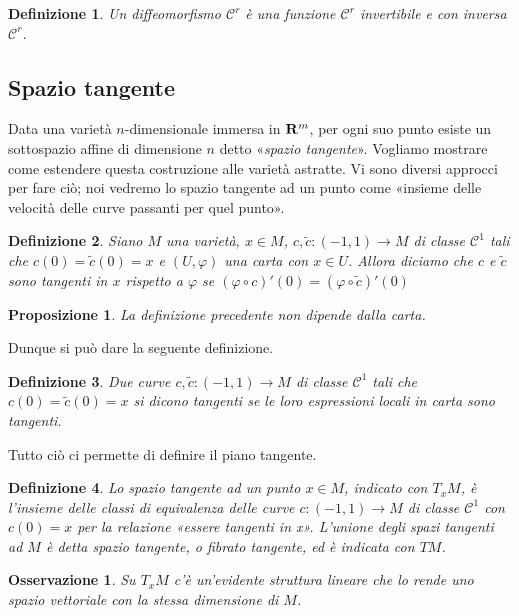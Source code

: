 \documentclass{article}
\newcommand{\PHI}{\varphi}
\newcommand{\composto}{\circ}
\newcommand{\cors}[1]{\textit{#1}}%
\newcommand{\ci}[1]{\mathscr{#1}}%
\newtheorem{definizione}{ Definizione}
\newtheorem{oss}{ Osservazione}
\newtheorem{proposizione}{ Proposizione}
\begin{document}
 \begin{definizione}
  Un diffeomorfismo $\ci{C}^r$ è una funzione $\ci{C}^r$ invertibile e con inversa $\ci{C}^r$.
 \end{definizione}
 
 \subsection{ Spazio tangente}
 
 Data una varietà $n$-dimensionale immersa in ${\bf R}^m$, per ogni suo punto esiste
 un sottospazio affine di dimensione $n$ detto «\cors{spazio tangente}». Vogliamo
 mostrare come estendere questa costruzione alle varietà astratte. Vi sono diversi
 approcci per fare ciò; noi vedremo lo spazio tangente ad un punto come «insieme delle
 velocità delle curve passanti per quel punto».
 
 \begin{definizione}
  Siano $M$ una varietà, $x\in M$, $c,\tilde{c}:(-1,1)\to M$ di classe $\ci{C}^1$ tali che
  $c(0)=\tilde{c}(0)=x$ e $(U,\PHI)$ una carta con $x\in U$. Allora diciamo che $c$ e
  $\tilde{c}$ sono tangenti in $x$ rispetto a $\PHI$ se $(\PHI\composto c)'(0)=(\PHI\composto\tilde{c})'(0)$
 \end{definizione}

 \begin{proposizione}
  La definizione precedente non dipende dalla carta.
 \end{proposizione}

 Dunque si può dare la seguente definizione.
 
 \begin{definizione}
  Due curve $c,\tilde{c}:(-1,1)\to M$ di classe $\ci{C}^1$ tali che $c(0)=\tilde{c}(0)=x$
  si dicono tangenti se le loro espressioni locali in carta sono tangenti.
 \end{definizione}

 Tutto ciò ci permette di definire il piano tangente.
 
 \begin{definizione}
  Lo spazio tangente ad un punto $x\in M$, indicato con $T_xM$, è l'insieme delle classi di equivalenza delle
  curve $c:(-1,1)\to M$ di classe $\ci{C}^1$ con $c(0)=x$ per la relazione «essere
  tangenti in x». L'unione degli spazi tangenti ad $M$ è detta spazio tangente, o
  fibrato tangente, ed è indicata con $TM$.
 \end{definizione}
 
 \begin{oss}
  Su $T_xM$ c'è un'evidente struttura lineare che lo rende uno spazio vettoriale con la
  stessa dimensione di $M$.
 \end{oss}
\end{document}
